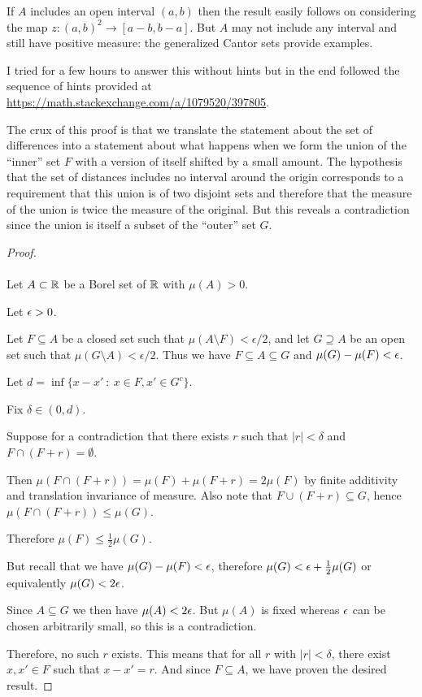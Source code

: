 \begin{remark*}
  If $A$ includes an open interval $(a, b)$ then the result easily follows on considering the
  map $z:(a, b)^2\to [a-b, b-a]$. But $A$ may not include any interval and still have positive measure: the
  generalized Cantor sets provide examples.
\end{remark*}

\begin{remark*}
  I tried for a few hours to answer this without hints but in the end followed the sequence of hints provided
  at \url{https://math.stackexchange.com/a/1079520/397805}.
\end{remark*}


\begin{intuition*}
  The crux of this proof is that we translate the statement about the set of differences into a statement about
  what happens when we form the union of the ``inner​'' set $F$ with a version of itself shifted by a small
  amount. The hypothesis that the set of distances includes no interval around the origin corresponds to a
  requirement that this union is of two disjoint sets and therefore that the measure of the union is twice the
  measure of the original. But this reveals a contradiction since the union is itself a subset of the ``outer​''
  set $G$.
\end{intuition*}

\begin{proof}~\\~\\
  Let $A \subset \mathbb{R}$ be a Borel set of $\mathbb{R}$ with $\mu(A) > 0$.

  Let $\epsilon > 0$.

  Let $F \subseteq A$ be a closed set such that $\mu(A \setminus F) < \epsilon/2$, and let $G \supseteq A$ be
  an open set such that $\mu(G \setminus A) < \epsilon/2$. Thus we have $F \subseteq A \subseteq G$
  and $\mu(G) - \mu(F) < \epsilon$.

  Let $d = \inf \{ x - x' ~:~ x \in F, x' \in G^c\}$.

  Fix $\delta \in (0, d)$.

  Suppose for a contradiction that there exists $r$ such that $|r| < \delta$ and $F \cap (F + r) = \emptyset$.

  Then $\mu(F \cap (F + r)) = \mu(F) + \mu(F + r) = 2\mu(F)$ by finite additivity and translation invariance of
  measure. Also note that $F \cup (F + r) \subseteq G$, hence $\mu(F \cap (F + r)) \leq \mu(G)$.

  Therefore $\mu(F) \leq \frac{1}{2}\mu(G)$.

  But recall that we have $\mu(G) - \mu(F) < \epsilon$, therefore $\mu(G) < \epsilon + \frac{1}{2}\mu(G)$ or
  equivalently $\mu(G) < 2\epsilon$.

  Since $A \subseteq G$ we then have $\mu(A) < 2\epsilon$. But $\mu(A)$ is fixed whereas $\epsilon$ can be chosen
  arbitrarily small, so this is a contradiction.

  Therefore, no such $r$ exists. This means that for all $r$ with $|r| < \delta$, there exist $x, x' \in F$
  such that $x - x' = r$. And since $F \subseteq A$, we have proven the desired result.
\end{proof}



